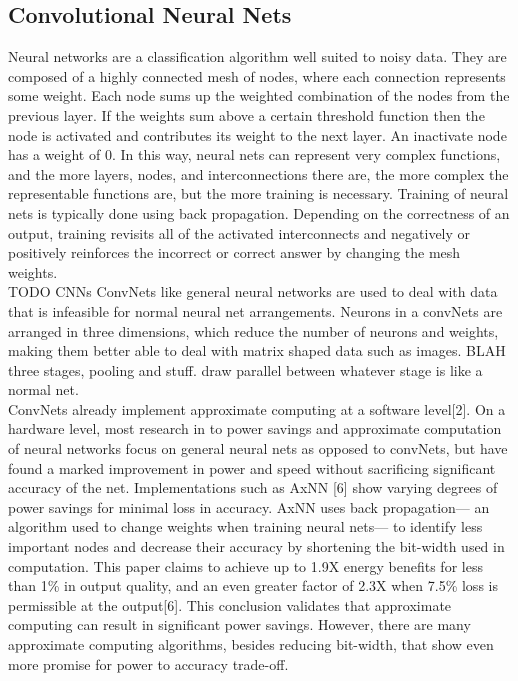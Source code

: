 \documentclass[journal]{IEEEtran}
\begin{document}
\subsection{Convolutional Neural Nets}
	\indent Neural networks are a classification algorithm well suited to noisy data. They are composed of a highly connected mesh of nodes, where each connection represents some weight. Each node sums up the weighted combination of the nodes from the previous layer. If the weights sum above a certain threshold function then the node is activated and contributes its weight to the next layer. An inactivate node has a weight of 0. In this way, neural nets can represent very complex functions, and the more layers, nodes, and interconnections there are, the more complex the representable functions are, but the more training is necessary. Training of neural nets is typically done using back propagation. Depending on the correctness of an output, training revisits all of the activated interconnects and negatively or positively reinforces the incorrect or correct answer by changing the mesh weights. \\
	
TODO CNNs
	\indent ConvNets like general neural networks are used to deal with data that is infeasible for normal neural net arrangements. Neurons in a convNets are arranged in three dimensions, which reduce the number of neurons and weights, making them better able to deal with matrix shaped data such as images. BLAH three stages, pooling and stuff. draw parallel between whatever stage is like a normal net.  \\
	
	\indent ConvNets already implement approximate computing at a software level[2]. On a hardware level, most research in to power savings and approximate computation of neural networks focus on general neural nets as opposed to convNets, but have found a marked improvement in power and speed without sacrificing significant accuracy of the net. Implementations such as AxNN [6] show varying degrees of power savings for minimal loss in accuracy. AxNN uses back propagation--- an algorithm used to change weights when training neural nets--- to identify less important nodes and decrease their accuracy by shortening the bit-width used in computation. This paper claims to achieve up to 1.9X energy benefits for less than 1\% in output quality, and an even greater factor of 2.3X when 7.5\% loss is permissible at the output[6]. This conclusion validates that approximate computing can result in significant power savings. However, there are many approximate computing algorithms, besides reducing bit-width, that show even more promise for power to accuracy trade-off.
\end{document}

